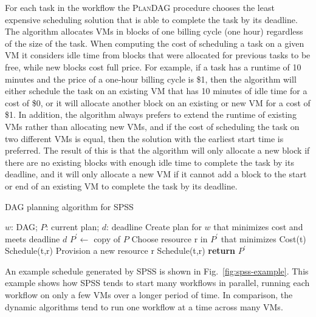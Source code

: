 \documentclass{sig-alternate}
\begin{document}
For each task in the workflow the \textsc{PlanDAG} procedure chooses the 
least expensive scheduling solution that is able to complete the task by 
its deadline. The algorithm allocates VMs in blocks of one billing cycle 
(one hour) regardless of the size of the task. When computing the cost 
of scheduling a task on a given VM it considers idle time from blocks that 
were allocated for previous tasks to be free, while new blocks cost full
price. For example, if a task has a runtime of 10 minutes and the price of
a one-hour billing cycle is \$1, then the algorithm will either schedule 
the task on an existing VM that has 10 minutes of idle time for a cost of 
\$0, or it will allocate another block on an existing or new VM for a cost
of \$1. In addition, the algorithm always prefers to extend the runtime of 
existing VMs rather than allocating new VMs, and if the cost of scheduling 
the task on two different VMs is equal, then the solution with the earliest 
start time is preferred. The result of this is that the algorithm will only
allocate a new block if there are no existing blocks with enough idle time
to complete the task by its deadline, and it will only allocate a new VM if
it cannot add a block to the start or end of an existing VM to complete the
task by its deadline.

\begin{algorithm}
\caption{DAG planning algorithm for SPSS}
\label{alg:plandag}
\begin{algorithmic}[1]
\Require $w$: DAG; $P$: current plan; $d$: deadline
\Ensure Create plan for $w$ that minimizes cost and meets deadline $d$
    \State $P^\prime\gets$ copy of $P$
    \State {}
        \State Choose resource r in $P^\prime$ that minimizes Cost(t)
            \State Schedule(t,r)
        \Else
            \State Provision a new resource r
            \State Schedule(t,r)
        \EndIf
    \EndFor
    \State \textbf{return} $P^\prime$
\EndProcedure
\end{algorithmic} 
\end{algorithm}

An example schedule generated by SPSS is shown in Fig.~\ref{fig:spss-example}.
This example shows how SPSS tends to start many workflows in parallel, running
each workflow on only a few VMs over a longer period of time. In comparison, 
the dynamic algorithms tend to run one workflow at a time across many VMs.
\end{document}
